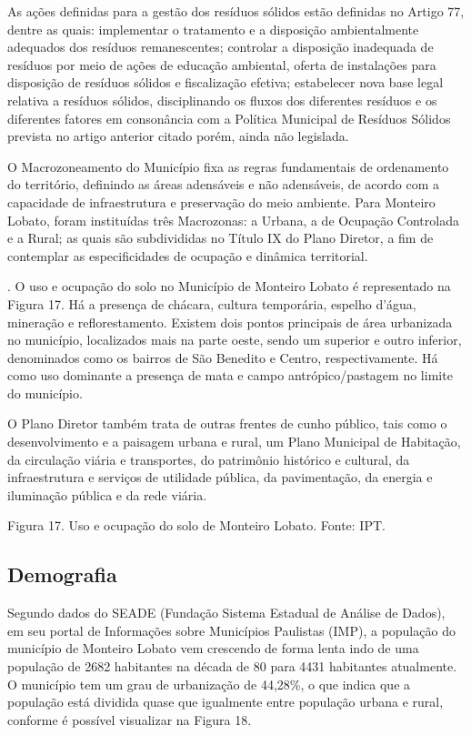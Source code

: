 As ações definidas para a gestão dos resíduos sólidos estão definidas no Artigo 77, dentre as quais: implementar o tratamento e a disposição ambientalmente adequados dos resíduos remanescentes; controlar a disposição inadequada de resíduos por meio de ações de educação ambiental, oferta de instalações para disposição de resíduos sólidos e fiscalização efetiva; estabelecer nova base legal relativa a resíduos sólidos, disciplinando os fluxos dos diferentes resíduos e os diferentes fatores em consonância com a Política Municipal de Resíduos Sólidos prevista no artigo anterior citado porém, ainda não  legislada.

O Macrozoneamento do Município fixa as regras fundamentais de ordenamento do território, definindo as áreas adensáveis e não adensáveis, de acordo com a capacidade de infraestrutura e preservação do meio ambiente. Para Monteiro Lobato, foram instituídas três Macrozonas: a Urbana, a de Ocupação Controlada e a Rural; as quais são subdivididas no Título IX do Plano Diretor, a fim de contemplar as especificidades de ocupação e dinâmica territorial.

. O uso e ocupação do solo no Município de Monteiro Lobato é representado na Figura 17. Há a presença de chácara, cultura temporária, espelho d’água, mineração e reflorestamento. Existem dois pontos principais de área urbanizada no município, localizados mais na parte oeste, sendo um superior e outro inferior, denominados como os bairros de São Benedito e Centro, respectivamente. Há como uso dominante a presença de mata e campo antrópico/pastagem no limite do município.

O Plano Diretor também trata de outras frentes de cunho público, tais como o desenvolvimento e a paisagem urbana e rural, um Plano Municipal de Habitação, da circulação viária e transportes, do patrimônio histórico e cultural, da infraestrutura e serviços de utilidade pública, da pavimentação, da energia e iluminação pública e da rede viária.

 
Figura 17. Uso e ocupação do solo de Monteiro Lobato.
Fonte: IPT.

\subsection{Demografia}
Segundo dados do SEADE (Fundação Sistema Estadual de Análise de Dados), em seu portal de Informações sobre Municípios Paulistas (IMP), a população do município de Monteiro Lobato vem crescendo de forma lenta indo de uma população de 2682 habitantes na década de 80 para 4431 habitantes atualmente. O município tem um grau de urbanização de 44,28\%, o que indica que a população está dividida quase que igualmente entre população urbana e rural, conforme é possível visualizar na Figura 18. 
 
